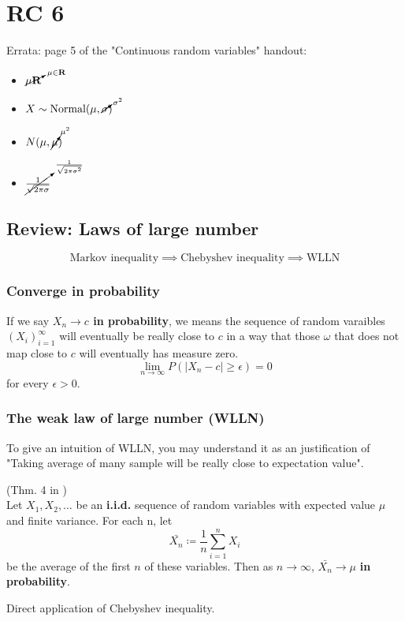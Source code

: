 \chapter{RC 6}

\begin{remark}
    Errata: page 5 of the "Continuous random variables" handout:\\
            \begin{itemize}
                \item \(\cancelto{\mu \in \mathbf{R} }{\mu \mathbf{R}} \) 
                \item \(X \sim \text{Normal}(\mu, \cancelto{\sigma^2 }{\sigma}) \) 
                \item \(N(\mu , \cancelto{\mu^2 }{\mu})\)
                \item \(\cancelto{\frac{1}{\sqrt{2 \pi \sigma^2 } }}{\frac{1}{\sqrt{2 \pi \sigma } }}\)  
            \end{itemize} 
\end{remark}

\section{Review: Laws of large number}
\[
    \text{Markov inequality} \implies \text{Chebyshev inequality} \implies \text{WLLN}  
\]


\subsection{Converge in probability}
If we say \textbf{ \(X_n \to c\) in probability}, we means the sequence of random varaibles \((X_i)_{i=1}^\infty\) will eventually be really close to \(c\) in a way that
those \(\omega \) that does not map close to \(c\) will eventually has measure zero. 
\[
    \lim\limits_{n \to \infty} P(|X_n -c| \geq \epsilon  ) = 0
\]    
for every \(\epsilon >0\). 
\subsection{The weak law of large number (WLLN)}
To give an intuition of WLLN, you may understand it as an justification of "Taking average of many sample will be really close to expectation value". 
\begin{theorem} 
    (Thm. 4 in \cite{Und_Chatterjee})\\
    Let \(X_1,X_2, \dots\) be an \textbf{i.i.d.} sequence of random variables with expected value \(\mu \) and finite variance. For each n, let 
    \[
        \bar{X_n} \coloneqq \frac{1}{n} \sum_{i=1}^{n} X_{i} 
    \]   
    be the average of the first \(n\) of these variables. Then as \(n \to \infty \), \(\bar{X_n} \to  \mu \) \textbf{in probability}.    
\end{theorem}
Direct application of Chebyshev inequality. 

